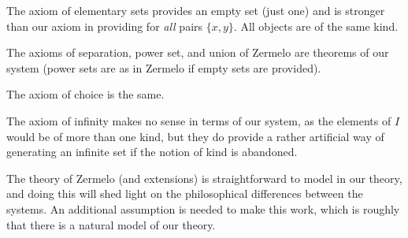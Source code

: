 \documentclass[12pt]{article}
\begin{document}
The axiom of elementary sets provides an empty set (just one) and is stronger than our axiom in providing for {\em all\/} pairs $\{x,y\}$.  All objects are of the same kind.

The axioms of separation, power set, and union of Zermelo are theorems of our system (power sets are as in Zermelo if empty sets are provided).

The axiom of choice is the same.

The axiom of infinity makes no sense in terms of our system, as the elements of $I$ would be of more than one kind, but they do provide a rather artificial way of generating an infinite set if the notion of kind is abandoned.

The theory of Zermelo (and extensions) is straightforward to model in our theory, and doing this will shed light on the philosophical differences between the systems.  An additional assumption is needed to make this work, which is roughly that there is a natural model of our theory.
\end{document}
